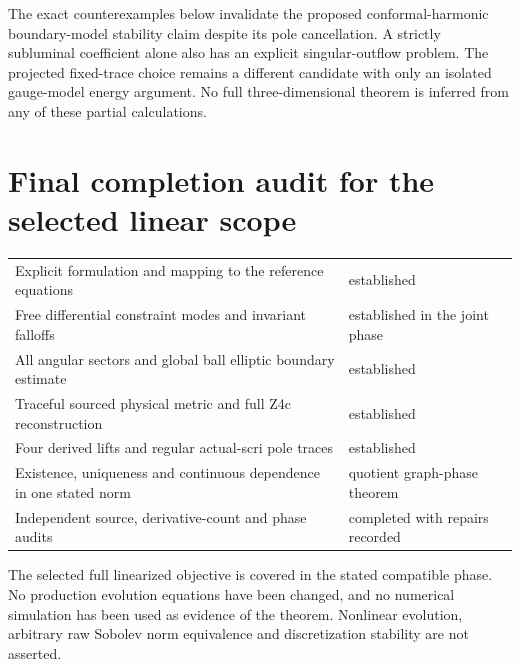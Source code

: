 \documentclass[11pt]{article}
\begin{document}
The exact counterexamples below invalidate the proposed conformal-harmonic
boundary-model stability claim despite its pole cancellation. A strictly
subluminal coefficient alone also has an explicit singular-outflow problem.
The projected fixed-trace choice remains a different candidate with only
an isolated gauge-model energy argument. No full three-dimensional theorem
is inferred from any of these partial calculations.
















\section*{Final completion audit for the selected linear scope}
\begin{center}
\begin{tabular}{p{.65\linewidth}p{.23\linewidth}}
Explicit formulation and mapping to the reference equations & established\\
Free differential constraint modes and invariant falloffs & established in the joint phase\\
All angular sectors and global ball elliptic boundary estimate & established\\
Traceful sourced physical metric and full Z4c reconstruction & established\\
Four derived lifts and regular actual-scri pole traces & established\\
Existence, uniqueness and continuous dependence in one stated norm & quotient graph-phase theorem\\
Independent source, derivative-count and phase audits & completed with repairs recorded
\end{tabular}
\end{center}
The selected full linearized objective is covered in the stated compatible phase. No production evolution equations have been changed, and no numerical simulation has been used as evidence of the theorem. Nonlinear evolution, arbitrary raw Sobolev norm equivalence and discretization stability are not asserted.
\end{document}
